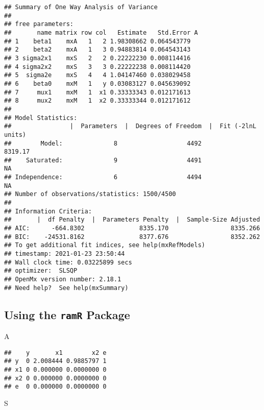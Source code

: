 \documentclass[
]{book}
\newenvironment{Shaded}{\begin{snugshade}}{\end{snugshade}}
\newcommand{\NormalTok}[1]{#1}
\theoremstyle{definition}
\theoremstyle{definition}
\theoremstyle{definition}
\theoremstyle{remark}
\begin{document}
\begin{verbatim}
## Summary of One Way Analysis of Variance 
##  
## free parameters:
##       name matrix row col   Estimate   Std.Error A
## 1    beta1    mxA   1   2 1.98308662 0.064543779  
## 2    beta2    mxA   1   3 0.94883814 0.064543143  
## 3 sigma2x1    mxS   2   2 0.22222230 0.008114416  
## 4 sigma2x2    mxS   3   3 0.22222238 0.008114420  
## 5  sigma2e    mxS   4   4 1.04147460 0.038029458  
## 6    beta0    mxM   1   y 0.03083127 0.045639092  
## 7     mux1    mxM   1  x1 0.33333343 0.012171613  
## 8     mux2    mxM   1  x2 0.33333344 0.012171612  
## 
## Model Statistics: 
##                |  Parameters  |  Degrees of Freedom  |  Fit (-2lnL units)
##        Model:              8                   4492               8319.17
##    Saturated:              9                   4491                    NA
## Independence:              6                   4494                    NA
## Number of observations/statistics: 1500/4500
## 
## Information Criteria: 
##       |  df Penalty  |  Parameters Penalty  |  Sample-Size Adjusted
## AIC:      -664.8302               8335.170                 8335.266
## BIC:    -24531.8162               8377.676                 8352.262
## To get additional fit indices, see help(mxRefModels)
## timestamp: 2021-01-23 23:50:44 
## Wall clock time: 0.03225899 secs 
## optimizer:  SLSQP 
## OpenMx version number: 2.18.1 
## Need help?  See help(mxSummary)
\end{verbatim}

\hypertarget{using-the-ramr-package-3}{%
\subsection{\texorpdfstring{Using the \texttt{ramR} Package}{Using the ramR Package}}\label{using-the-ramr-package-3}}

\begin{Shaded}
\begin{Highlighting}[]
\NormalTok{A}
\end{Highlighting}
\end{Shaded}

\begin{verbatim}
##    y       x1        x2 e
## y  0 2.008444 0.9885797 1
## x1 0 0.000000 0.0000000 0
## x2 0 0.000000 0.0000000 0
## e  0 0.000000 0.0000000 0
\end{verbatim}

\begin{Shaded}
\begin{Highlighting}[]
\NormalTok{S}
\end{Highlighting}
\end{Shaded}
\end{document}
